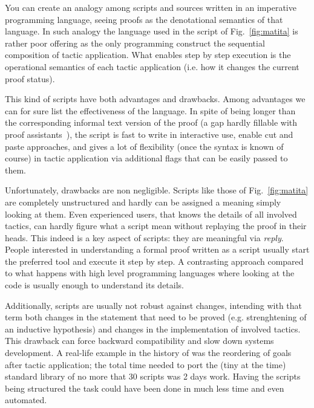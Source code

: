 
You can create an analogy among scripts and sources written in an imperative
programming language, seeing proofs as the denotational semantics of that
language. In such analogy the language used in the script of
Fig.~\ref{fig:matita} is rather poor offering as the only programming construct
the sequential composition of tactic application. What enables step by step
execution is the operational semantics of each tactic application (i.e. how it
changes the current proof status).


This kind of scripts have both advantages and drawbacks. Among advantages we can
for sure list the effectiveness of the language. In spite of being longer than
the corresponding informal text version of the proof (a gap hardly fillable with
proof assistants~\cite{debrujinfactor}), the script is fast to write in
interactive use, enable cut and paste approaches, and gives a lot of flexibility
(once the syntax is known of course) in tactic application via additional flags
that can be easily passed to them.


Unfortunately, drawbacks are non negligible. Scripts like those of
Fig.~\ref{fig:matita} are completely unstructured and hardly can be assigned a
meaning simply looking at them. Even experienced users, that knows the details
of all involved tactics, can hardly figure what a script mean without replaying
the proof in their heads. This indeed is a key aspect of scripts: they are
meaningful via \emph{reply}. People interested in understanding a formal proof
written as a script usually start the preferred tool and execute it step by
step. A contrasting approach compared to what happens with high level
programming languages where looking at the code is usually enough to understand
its details.


Additionally, scripts are usually not robust against changes, intending with
that term both changes in the statement that need to be proved (e.g.
strenghtening of an inductive hypothesis) and changes in the implementation of
involved tactics. This drawback can force backward compatibility and slow down
systems development. A real-life example in the history of \MATITA{} was the
reordering of goals after tactic application; the total time needed to port the
(tiny at the time) standard library of no more that 30 scripts was 2 days work.
Having the scripts being structured the task could have been done in much less
time and even automated.

